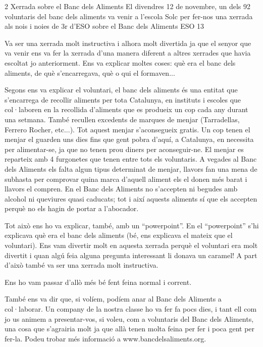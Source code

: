 %
%

\begin{news}
{2} %
{Xerrada sobre el Banc dels Aliments}
{El divendres 12 de novembre,  un dels 92 voluntaris del banc dels aliments va venir a l’escola Solc per fer-nos una xerrada als nois i noies de 3r d’ESO sobre el Banc dels Aliments}
{ESO}
{13} %


Va ser una xerrada molt instructiva i alhora molt divertida ja que el senyor que va venir ens va fer la xerrada d’una manera diferent a altres xerrades que havia escoltat jo anteriorment. Ens va explicar moltes coses: què era el banc dels aliments, de què s’encarregava, què o qui el formaven...

Segons ens va explicar el voluntari, el banc dels aliments és una entitat que s’encarrega de recollir aliments per tota Catalunya, en instituts i escoles que col·laboren en la recollida d’aliments que es produeix un cop cada any durant una setmana. També recullen excedents de marques de menjar (Tarradellas, Ferrero Rocher, etc...). Tot aquest menjar s’aconsegueix gratis. Un cop tenen el menjar el guarden uns dies fins que gent pobra d’aquí, a Catalunya, en necessita per alimentar-se,  ja que no tenen prou diners per aconseguir-ne. El menjar es reparteix amb 4 furgonetes que tenen entre tots els voluntaris. A vegades al Banc dels Aliments els falta algun tipus determinat de menjar, llavors fan una mena de subhasta per comprovar quina marca d’aquell aliment els el donen més barat i llavors el compren. En el Banc dels Aliments no s’accepten ni begudes amb alcohol ni queviures quasi caducats;  tot i així aquests aliments sí que els accepten perquè no els hagin de portar a l’abocador.

Tot això ens  ho va explicar, també,  amb un “powerpoint”. En el “powerpoint” s’hi explicava què era el banc dels aliments (bé, ens explicava el mateix que el voluntari). Ens vam divertir molt en aquesta xerrada perquè el voluntari era molt divertit i quan algú feia alguna pregunta interessant li donava un caramel! A part d’això també va ser una xerrada molt instructiva.

Ens ho vam passar d’allò més bé fent feina normal i corrent.

També ens va dir que, si volíem, podíem anar al Banc dels Aliments a col·laborar. Un company de la nostra classe ho va fer fa pocs dies, i tant ell com jo us animem a presentar-vos, si voleu, com a voluntaris del Banc dels Aliments, una cosa que s’agrairia molt ja que allà tenen molta feina per fer i poca gent per fer-la. Podeu trobar més informació a www.bancdelsaliments.org.


\end{news}
